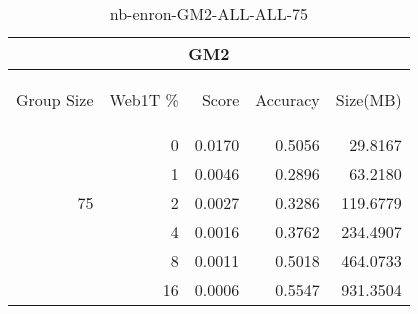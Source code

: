 \begin{center}
\begin{table}[htbp]
\begin{tabular}{ | r | r | r | r | r |}
\hline
\multicolumn{5}{|c|}{GM2}\\
\hline
\begin{sideways}Group Size\end{sideways} & \begin{sideways}Web1T \%\end{sideways} & \begin{sideways}Score\end{sideways} & \begin{sideways}Accuracy\end{sideways} & \begin{sideways}Size(MB)\end{sideways}\\
\hline
\multirow{5}{*}{75}
 & 0 & 0.0170 & 0.5056 & 29.8167\\ \cline{2-5}
 & 1 & 0.0046 & 0.2896 & 63.2180\\ \cline{2-5}
 & 2 & 0.0027 & 0.3286 & 119.6779\\ \cline{2-5}
 & 4 & 0.0016 & 0.3762 & 234.4907\\ \cline{2-5}
 & 8 & 0.0011 & 0.5018 & 464.0733\\ \cline{2-5}
 & 16 & 0.0006 & 0.5547 & 931.3504\\ \cline{2-5}
\hline
\end{tabular}
\caption{nb-enron-GM2-ALL-ALL-75}
\label{table:nb-enron-GM2-ALL-ALL-75}
\end{table}
\end{center}

